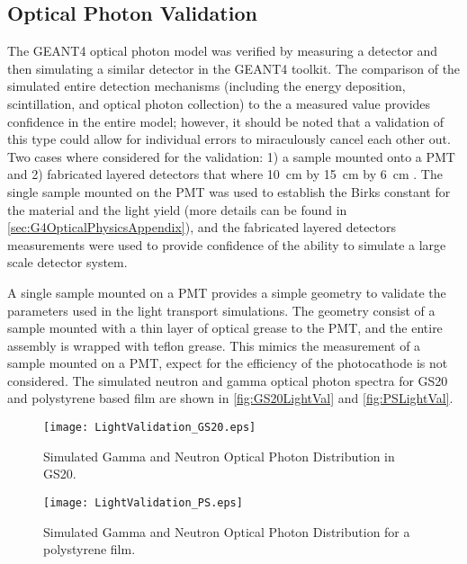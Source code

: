 \subsection{Optical Photon Validation}
\label{sec:OpticalPhotonValidation}
The GEANT4 optical photon model was verified by measuring a detector and then simulating a similar detector in the GEANT4 toolkit. 
The comparison of the simulated entire  detection mechanisms (including the energy deposition, scintillation, and optical photon collection) to the a measured value provides confidence in the entire model; however, it should be noted that a validation of this type could allow for individual errors to miraculously cancel each other out.
Two cases where considered for the validation: 1) a sample mounted onto a PMT and 2) fabricated layered detectors that where  \SI{10}{cm} by \SI{15}{cm} by \SI{6}{cm} .
The single sample mounted on the PMT was used to establish the Birks constant for the material and the light yield (more details can be found in \autoref{sec:G4OpticalPhysicsAppendix}), and the fabricated layered detectors measurements were used to provide confidence of the ability to simulate a large scale detector system.

A single sample mounted on a PMT provides a simple geometry to validate the parameters used in the light transport simulations. 
The geometry consist of a sample mounted with a thin layer of optical grease to the PMT, and the entire assembly is wrapped with teflon grease.
This mimics the measurement of a sample mounted on a PMT, expect for the efficiency of the photocathode is not considered.
The simulated neutron and gamma optical photon spectra for GS20 and polystyrene based film are shown in \autoref{fig:GS20LightVal} and \autoref{fig:PSLightVal}.
\begin{figure}
	\centering
	\texttt{[image: LightValidation\_GS20.eps]}
	\caption{Simulated Gamma and Neutron Optical Photon Distribution in GS20.}
	\label{fig:GS20LightVal}
\end{figure}
\begin{figure}
	\centering
	\texttt{[image: LightValidation\_PS.eps]}
	\caption{Simulated Gamma and Neutron Optical Photon Distribution for a polystyrene film.}
	\label{fig:PSLightVal}
\end{figure}

